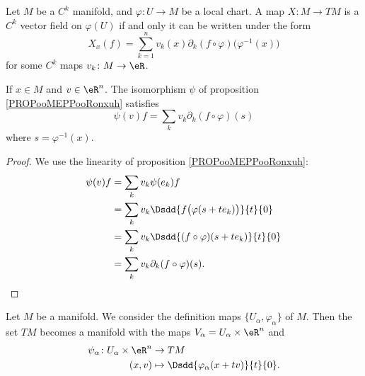 \begin{lemma}        \label{LEMooZWFAooDlYaJm}
    Let \( M\) be a \( C^k\) manifold, and \( \varphi\colon U\to M\) be a local chart. A map \( X\colon M\to TM\) is a \( C^k\) vector field on \( \varphi(U)\) if and only it can be written under the form
    \begin{equation}
        X_x(f)=\sum_{k=1}^nv_k(x)\partial_k(f\circ\varphi)\big( \varphi^{-1}(x) \big)
    \end{equation}
    for some \( C^k\) maps \( v_k\colon M\to \eR\).
\end{lemma}

\begin{lemma}       \label{LEMooIQZWooOSLNXB}
    If \( x\in M\) and \( v\in \eR^n\). The isomorphism \( \psi\) of proposition \ref{PROPooMEPPooRonxuh} satisfies
    \begin{equation}        \label{EQooBVOBooBTfYWC}
        \psi(v)f=\sum_kv_k\partial_k(f\circ\varphi)(s)
    \end{equation}
    where \( s=\varphi^{-1}(x)\).
\end{lemma}

\begin{proof}
    We use the linearity of proposition \ref{PROPooMEPPooRonxuh}:
    \begin{subequations}
        \begin{align}
            \psi(v)f&=\sum_kv_k\psi(e_k)f\\
            &=\sum_kv_k\Dsdd{ f\big( \varphi(s+te_k) \big) }{t}{0}\\
            &=\sum_kv_k\Dsdd{ (f\circ\varphi)(s+te_k) }{t}{0}\\
            &=\sum_kv_k\partial_k(f\circ\varphi)(s).
        \end{align}
    \end{subequations}
\end{proof}

\begin{theorem}     \label{THOooTSQXooLvJMQb}
    Let \( M\) be a manifold. We consider the definition maps \( \{ U_{\alpha}, \varphi_{\alpha} \}\) of \( M\). Then the set \( TM\) becomes a manifold with the maps \( V_{\alpha}=U_{\alpha}\times \eR^n\) and
    \begin{equation}
        \begin{aligned}
            \psi_{\alpha}\colon U_{\alpha}\times \eR^n&\to TM \\
            (x,v)&\mapsto \Dsdd{ \varphi_{\alpha}(x+tv) }{t}{0}. 
        \end{aligned}
    \end{equation}
\end{theorem}


